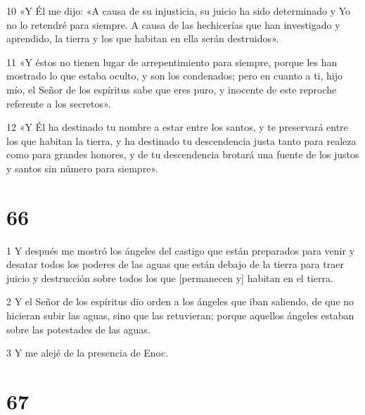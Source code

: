 \par 10 «Y Él me dijo: «A causa de su injusticia, su juicio ha sido determinado y Yo no lo retendré para siempre. A causa de las hechicerías que han investigado y aprendido, la tierra y los que habitan en ella serán destruidos».
\par 11 «Y éstos no tienen lugar de arrepentimiento para siempre, porque les han mostrado lo que estaba oculto, y son los condenados; pero en cuanto a ti, hijo mío, el Señor de los espíritus sabe que eres puro, y inocente de este reproche referente a los secretos».
\par 12 «Y Él ha destinado tu nombre a estar entre los santos, y te preservará entre los que habitan la tierra, y ha destinado tu descendencia justa tanto para realeza como para grandes honores, y de tu descendencia brotará una fuente de los justos y santos sin número para siempre».

\chapter{66}

\par 1 Y después me mostró los ángeles del castigo que están preparados para venir y desatar todos los poderes de las aguas que están debajo de la tierra para traer juicio y destrucción sobre todos los que [permanecen y] habitan en el tierra.
\par 2 Y el Señor de los espíritus dio orden a los ángeles que iban saliendo, de que no hicieran subir las aguas, sino que las retuvieran; porque aquellos ángeles estaban sobre las potestades de las aguas.
\par 3 Y me alejé de la presencia de Enoc.

\chapter{67}

